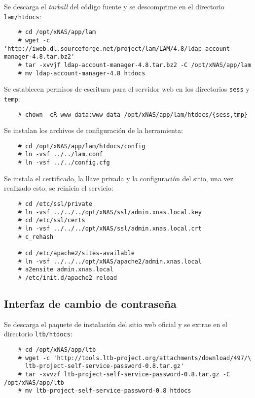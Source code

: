 Se descarga el \textit{tarball} del c\'{o}digo fuente y se descomprime en el directorio \texttt{lam/htdocs}:

{
\scriptsize
\linespread{1}
\begin{verbatim}
    # cd /opt/xNAS/app/lam
    # wget -c 'http://iweb.dl.sourceforge.net/project/lam/LAM/4.8/ldap-account-manager-4.8.tar.bz2'
    # tar -xvvjf ldap-account-manager-4.8.tar.bz2 -C /opt/xNAS/app/lam
    # mv ldap-account-manager-4.8 htdocs
\end{verbatim}
}

Se establecen permisos de escritura para el servidor web en los directorios \texttt{sess} y \texttt{temp}:

{
\scriptsize
\linespread{1}
\begin{verbatim}
    # chown -cR www-data:www-data /opt/xNAS/app/lam/htdocs/{sess,tmp}
\end{verbatim}
}

Se instalan los archivos de configuraci\'{o}n de la herramienta:

{
\scriptsize
\linespread{1}
\begin{verbatim}
    # cd /opt/xNAS/app/lam/htdocs/config
    # ln -vsf ../../lam.conf
    # ln -vsf ../../config.cfg
\end{verbatim}
}

Se instala el certificado, la llave privada y la configuraci\'{o}n del sitio, una vez realizado esto, se reinicia el servicio:

{
\scriptsize
\linespread{1}
\begin{verbatim}
    # cd /etc/ssl/private
    # ln -vsf ../../../opt/xNAS/ssl/admin.xnas.local.key
    # cd /etc/ssl/certs
    # ln -vsf ../../../opt/xNAS/ssl/admin.xnas.local.crt
    # c_rehash

    # cd /etc/apache2/sites-available
    # ln -vsf ../../../opt/xNAS/apache2/admin.xnas.local
    # a2ensite admin.xnas.local
    # /etc/init.d/apache2 reload
\end{verbatim}
}

      \subsection {Interfaz de cambio de contrase\~{n}a}

Se descarga el paquete de instalaci\'{o}n del sitio web oficial y se extrae en el directorio \texttt{ltb/htdocs}:

{
\scriptsize
\linespread{1}
\begin{verbatim}
    # cd /opt/xNAS/app/ltb
    # wget -c 'http://tools.ltb-project.org/attachments/download/497/\
      ltb-project-self-service-password-0.8.tar.gz'
    # tar -xvvzf ltb-project-self-service-password-0.8.tar.gz -C /opt/xNAS/app/ltb
    # mv ltb-project-self-service-password-0.8 htdocs
\end{verbatim}
}

